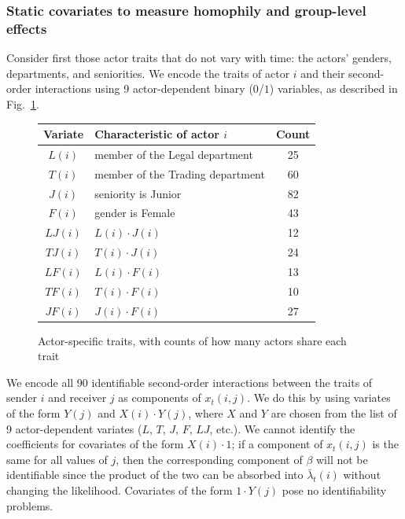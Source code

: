 \documentclass[final]{statsoc}
\begin{document}
\subsubsection{Static covariates to measure homophily and group-level effects}

Consider first those actor traits that do not vary with time: the actors'
genders, departments, and seniorities.  We encode the traits of actor $i$ and
their second-order interactions using 9 actor-dependent binary ($0$/$1$)
variables, as described in Fig.~\ref{F:enron-actors}.
\begin{figure}
\centering
\begin{tabular}{clc}
\toprule
Variate & Characteristic of actor $i$ & Count\\
\midrule
$L(i)$ & member of the Legal department   & 25 \\
$T(i)$ & member of the Trading department & 60 \\
$J(i)$ & seniority is Junior              & 82 \\
$F(i)$ & gender is Female                 & 43 \\
$LJ(i)$ & $L(i) \cdot J(i)$               & 12 \\
$TJ(i)$ & $T(i) \cdot J(i)$               & 24 \\
$LF(i)$ & $L(i) \cdot F(i)$               & 13 \\
$TF(i)$ & $T(i) \cdot F(i)$               & 10 \\
$JF(i)$ & $J(i) \cdot F(i)$               & 27 \\
\bottomrule
\end{tabular}
\caption{
  Actor-specific traits, with counts of how many actors share each trait
}
\label{F:enron-actors}
\end{figure}

We encode all 90 identifiable second-order interactions between the traits of
sender $i$ and receiver $j$ as components of $x_t(i,j)$.  We do this by using
variates of the form $Y(j)$ and $X(i)\cdot Y(j)$, where $X$ and $Y$ are chosen
from the list of 9 actor-dependent variates ($L$, $T$, $J$, $F$, $LJ$, etc.).
We cannot identify the coefficients for covariates of the form $X(i) \cdot 1$;
if a component of $x_t(i,j)$ is the same for all values of $j$, then the
corresponding component of $\beta$ will not be identifiable since the product
of the two can be absorbed into $\bar \lambda_t(i)$ without changing the
likelihood.  Covariates of the form $1 \cdot Y(j)$ pose no identifiability
problems.
\end{document}
